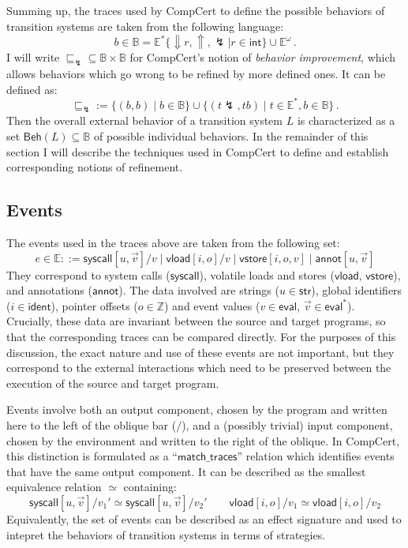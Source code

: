 \documentclass[11pt,oneside,draft]{book}
\theoremstyle{definition}
\newcommand{\kw}[1]{\ensuremath{ \mathsf{#1} }}
\newcommand{\refby}{\sqsubseteq} %
\begin{document}
Summing up,
the traces used by CompCert to define
the possible behaviors of transition systems
are taken from the following language:
\[
  b \in \mathbb{B} =
    \mathbb{E}^*
      \{ {\Downarrow} r, {\Uparrow}, {\lightning} \mid r \in \kw{int} \}
      \cup
    \mathbb{E}^\omega
  \,.
\]
I will write
${\refby_\lightning} \subseteq \mathbb{B} \times \mathbb{B}$
for CompCert's notion of \emph{behavior improvement},
which allows behaviors which go wrong to
be refined by more defined ones.
It can be defined as:
\[
  {\refby_\lightning} := \{ (b, b) \mid b \in \mathbb{B} \}
    \cup \{ (t \lightning, t b) \mid
            t \in \mathbb{E}^*, b \in \mathbb{B} \}
  \,.
\]
Then the overall external behavior
of a transition system $L$
is characterized
as a set $\kw{Beh}(L) \subseteq \mathbb{B}$
of possible individual behaviors.
In the remainder of this section I will describe
the techniques used in CompCert to define and establish
corresponding notions of refinement.



\subsection{Events} %

The events used in the traces above are taken from the following set:
\[
  e \in \mathbb{E} ::=
    \kw{syscall}[u, \vec{v}]/v \mid
    \kw{vload}[i, o]/v \mid
    \kw{vstore}[i, o, v] \mid
    \kw{annot}[u, \vec{v}]
\]
They correspond to system calls ($\kw{syscall}$),
volatile loads and stores ($\kw{vload}$, $\kw{vstore}$),
and annotations ($\kw{annot}$).
The data involved
are strings ($u \in \kw{str}$),
global identifiers ($i \in \kw{ident}$),
pointer offsets ($o \in \mathbb{Z}$) and
event values ($v \in \kw{eval}$, $\vec{v} \in \kw{eval}^*$).
Crucially,
these data are invariant between the source and target programs,
so that the corresponding traces can be compared directly.
For the purposes of this discussion,
the exact nature and use of these events
are not important,
but they correspond to the external interactions
which need to be preserved between the execution
of the source and target program.

Events involve both an output component,
chosen by the program and
written here to the left of the oblique bar ($/$),
and a (possibly trivial) input component,
chosen by the environment and written to the right of the oblique.
In CompCert,
this distinction is formulated as a ``$\kw{match\_traces}$'' relation
which identifies events that have the same output component.
It can be described as the smallest equivalence relation $\simeq$
containing:
\[
  \kw{syscall}[u, \vec{v}]/v_1' \simeq
  \kw{syscall}[u, \vec{v}]/v_2'
  \qquad
  \kw{vload}[i, o]/v_1 \simeq
  \kw{vload}[i, o]/v_2
\]
Equivalently,
the set of events can be described as an effect signature
and used to intepret the behaviors of transition systems
in terms of strategies.
\end{document}
